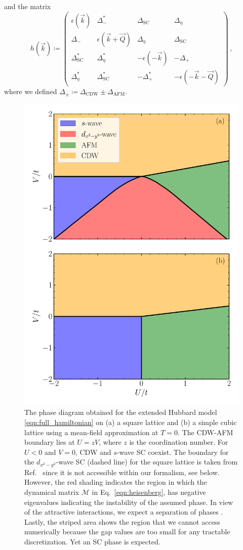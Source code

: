 \documentclass[
    reprint, 
    aps,
    preprintnumbers,
    twocolumn,
    prb,
    superscriptaddress
]{revtex4-2}
\newcommand{\vk}{\vec{k}}
\newcommand{\vQ}{\vec{Q}}
\newcommand{\mM}{\mathcal{M}}
\begin{document}
and the matrix
\begin{equation}
    h(\vk) \coloneqq  \begin{pmatrix}
        \epsilon (\vk) & \Delta_-^* & \Delta_\text{SC} & \Delta_\eta \\
        \Delta_- & \epsilon (\vk + \vQ) & \Delta_\eta & \Delta_\text{SC} \\
        \Delta_\text{SC}^* & \Delta_\eta^* & - \epsilon (-\vk) & - \Delta_+ \\
        \Delta_\eta^* & \Delta_\text{SC}^* & - \Delta_+^* & - \epsilon (-\vk - \vQ)
        \end{pmatrix}\,,
\end{equation}
where we defined $\Delta_\pm \coloneqq \Delta_\text{CDW} \pm \Delta_\text{AFM}$.

\begin{figure}
    \centering
    \includegraphics[width=.48\textwidth]{plots/phase_diagram.pdf}
    \caption{The phase diagram obtained for the extended Hubbard model \eqref{eqn:full_hamiltonian} on 
    (a) a square lattice and (b) a simple cubic lattice using a mean-field approximation at $T=0$.
    The CDW-AFM boundary lies at $U = zV$, where $z$ is the coordination number. 
    For $U<0$ and $V=0$,  CDW and $s$-wave SC coexist.
    The boundary for the $d_{x^2 - y^2}$-wave SC (dashed line) for the square lattice is  taken from Ref.\
		\cite{Micnas88b} since it is not accessible within our formalism, see below.
    However, the red shading indicates the region in which the dynamical matrix $\mM$ in 
		Eq.\ \eqref{eqn:heisenberg}, has negative eigenvalues indicating the instability of the assumed phase.
    In view of the attractive interactions, we expect a separation of phases \cite{Linner23}.
    Lastly, the striped area shows the region that we cannot access numerically
		because the gap values are too small for any tractable discretization. 
    Yet an SC phase is expected.}
    \label{fig:phase_diagram}
\end{figure}
\end{document}
